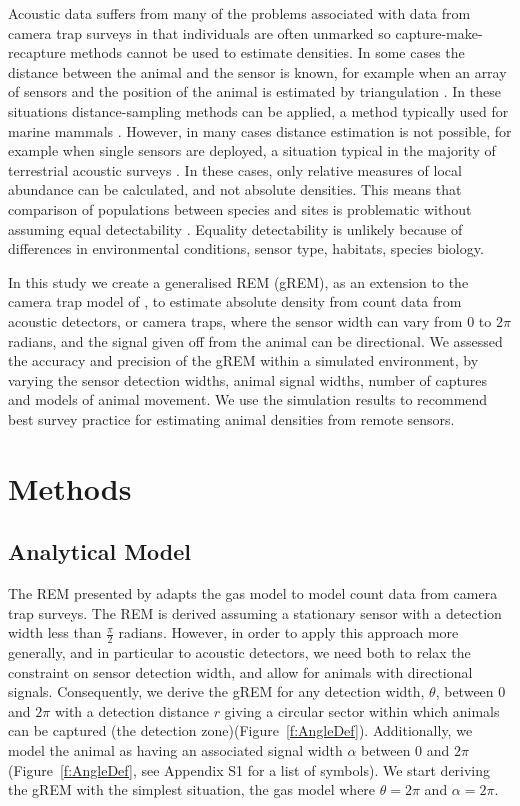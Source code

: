 \documentclass[a4paper,10pt,reqno,oneside]{amsart}
\begin{document}
Acoustic data suffers from many of the problems associated with data from camera trap surveys in that individuals are often unmarked so capture-make-recapture methods cannot be used to estimate densities. In some cases the distance between the animal and the sensor is known, for example when an array of sensors and the position of the animal is estimated by triangulation \citep{lewis2007sperm}. In these situations distance-sampling methods can be applied, a method typically used for marine mammals \citep{rogers2013density}. However, in many cases distance estimation is not possible, for example when single sensors are deployed, a situation typical in the majority of terrestrial acoustic surveys  \citep{elphick2008you, buckland2008estimating}. In these cases, only relative measures of local abundance can be calculated, and not absolute densities. This means that comparison of populations between species and sites is problematic without assuming equal detectability \citep{schmidt2003count}. %
Equality detectability is unlikely because of differences in environmental conditions, sensor type, habitats, species biology. 

In this study we create a generalised REM (gREM), as an extension to the camera trap model of \citep{rowcliffe2008estimating}, to estimate absolute density from count data from acoustic detectors, or camera traps, where the sensor width can vary from 0 to $2\pi$ radians, and the signal given off from the animal can be directional. We assessed the accuracy and precision of the gREM within a simulated environment, by varying the sensor detection widths, animal signal widths, number of captures and models of animal movement. We use the simulation results to recommend best survey practice for estimating animal densities from remote sensors. 

\section{Methods}

\subsection{Analytical Model}

The REM presented by \citep{rowcliffe2008estimating} adapts the gas model to model count data from camera trap surveys. The REM is derived assuming a stationary sensor with a detection width less than $\frac{\pi}{2}$ radians. However, in order to apply this approach more generally, and in particular to acoustic detectors, we need both to relax the constraint on sensor detection width, and allow for animals with directional signals. Consequently, we derive the gREM for any detection width, $ \theta$, between 0 and $2\pi$ with a detection distance $r$ giving a circular sector within which animals can be captured (the detection zone)(Figure~\ref{f:AngleDef}). Additionally, we model the animal as having an associated signal width $\alpha$ between 0 and $2\pi$(Figure~\ref{f:AngleDef}, see Appendix S1 for a list of symbols). We start deriving the gREM with the simplest situation, the gas model where $\theta =  2\pi$ and $ \alpha =  2\pi$. 
\end{document}
